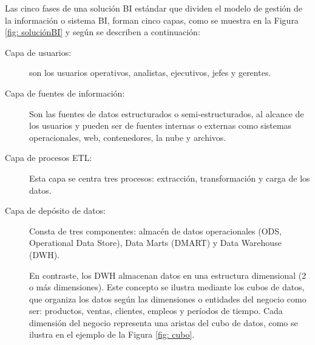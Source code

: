 \documentclass[12pt,jou]{apa7}
\begin{document}
Las cinco fases de una solución BI estándar que dividen el modelo de gestión de la información o sistema BI, forman cinco capas, como se muestra en la Figura \ref{fig: soluciónBI} y según \cite{Joyanes} se describen a continuación: 

\begin{description}
	\item[Capa de usuarios:]  son los usuarios operativos, analistas, ejecutivos, jefes y gerentes.
	
	\item[Capa de fuentes de información:] Son las fuentes de datos estructurados o semi-estructurados, al alcance de los usuarios y pueden ser de fuentes internas o externas como sistemas operacionales, web, contenedores, la nube y archivos.
	
	\item[Capa de procesos ETL:] Esta capa se centra tres procesos: extracción, transformación y carga de los datos. 
	
	\item[Capa de depósito de datos:] Consta de tres componentes: almacén de datos operacionales (ODS, Operational Data Store), Data Marts (DMART) y Data Warehouse (DWH).
	
En contraste, los DWH almacenan datos en una estructura dimensional (2 o más dimensiones). Este concepto se ilustra mediante los cubos de datos, que organiza los datos según las dimensiones o entidades del negocio como ser: productos, ventas, clientes, empleos y períodos de tiempo. Cada dimensión del negocio representa una aristas del cubo de datos, como se ilustra en el ejemplo de la Figura \ref{fig: cubo}.
	

\end{description}
\end{document}

